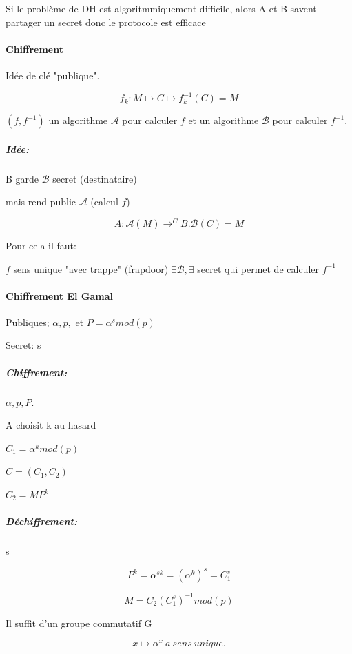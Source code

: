 \documentclass[12pt,a4paper]{article}
\begin{document}
Si le problème de DH est algoritmmiquement difficile, alors A et B savent partager un secret donc le protocole est efficace

\paragraph{Chiffrement}

Idée de clé "publique".

\begin{displaymath}
f_k : M \longmapsto C \longmapsto f_k^{-1} (C) = M
\end{displaymath}

$(f,f^{-1})$ un algorithme $\mathcal{A}$ pour calculer $f$ et un algorithme $\mathcal{B}$ pour calculer $f^{-1}$. 

\subparagraph{Idée:}

B garde $\mathcal{B}$ secret (destinataire) 

mais rend public $\mathcal{A}$ (calcul $f$)

\begin{displaymath}
A : \mathcal{A}(M) \longrightarrow^C B. \mathcal{B}(C) = M
\end{displaymath}

Pour cela il faut:

$f$  sens unique "avec trappe" (frapdoor) $\exists \mathcal{B}, \exists$ secret qui permet de calculer $f^{-1}$

\paragraph{Chiffrement El Gamal}

Publiques; $\alpha, p,$ et $P=\alpha^s mod(p)$

Secret: s

\subparagraph{Chiffrement:} $\alpha, p, P.$

A choisit k au hasard 

$C_1 = \alpha^k mod(p)$

$C=(C_1,C_2)$

$C_2 = MP^k$

\subparagraph{Déchiffrement:} s

\begin{displaymath}
P^k = \alpha^{sk} = (\alpha^k)^s = C^s_1
\end{displaymath}

\begin{displaymath}
M = C_2(C_1^ s)^{-1} mod(p)
\end{displaymath}


Il suffit d'un groupe commutatif G

\begin{displaymath}
x \longmapsto \alpha^x \ a \ sens \ unique.
\end{displaymath}

 
\end{document}
